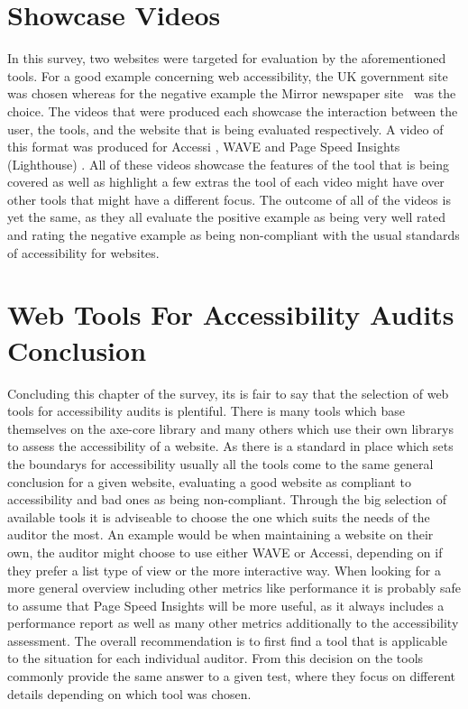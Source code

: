 \section{Showcase Videos}

In this survey, two websites were targeted for evaluation by the
aforementioned tools. For a good example concerning web accessibility,
the UK government site~\parencite{GovUK} was chosen whereas for the
negative example the Mirror newspaper site~\parencite{MirrorUK} was the choice. The
videos that were produced each showcase the interaction between the
user, the tools, and the website that is being evaluated
respectively. A video of this format was produced for Accessi
\parencite{Accessi_vid}, WAVE \parencite{WAVE_vid} and Page Speed
Insights (Lighthouse) \parencite{PageSpeedInsights_vid}. All of these
videos showcase the features of the tool that is being covered as well
as highlight a few extras the tool of each video might have over other
tools that might have a different focus. The outcome of all of the
videos is yet the same, as they all evaluate the positive example as
being very well rated and rating the negative example as being
non-compliant with the usual standards of accessibility for websites.



\section{Web Tools For Accessibility Audits Conclusion}

Concluding this chapter of the survey, its is fair to say that the
selection of web tools for accessibility audits is plentiful. There is
many tools which base themselves on the axe-core library and many
others which use their own librarys to assess the accessibility of a
website. As there is a standard in place which sets the boundarys for
accessibility usually all the tools come to the same general
conclusion for a given website, evaluating a good website as compliant
to accessibility and bad ones as being non-compliant. Through the big
selection of available tools it is adviseable to choose the one which
suits the needs of the auditor the most. An example would be when
maintaining a website on their own, the auditor might choose to use
either WAVE or Accessi, depending on if they prefer a list type of
view or the more interactive way. When looking for a more general
overview including other metrics like performance it is probably safe
to assume that Page Speed Insights will be more useful, as it always
includes a performance report as well as many other metrics
additionally to the accessibility assessment. The overall
recommendation is to first find a tool that is applicable to the
situation for each individual auditor. From this decision on the tools
commonly provide the same answer to a given test, where they focus on
different details depending on which tool was chosen.


